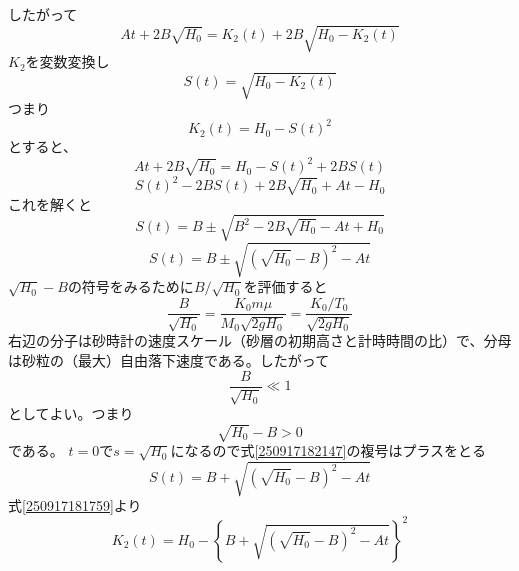 \documentclass[]{article}
\begin{document}
したがって
\begin{equation} \label{250917181329} 
   A t + 2B\sqrt{H_0} = K_2(t) + 2B\sqrt{H_0-K_2(t)}
\end{equation}
$K_2$を変数変換し
\begin{equation} \label{250917181440} 
   S(t) =  \sqrt{H_0 - K_2(t)}
\end{equation}
つまり
\begin{equation} \label{250917181759} 
   K_2(t) = H_0 - S(t)^2
\end{equation}
とすると、
\begin{equation} \label{250917181553} 
   A t + 2B\sqrt{H_0}  = H_0 - S(t)^2 + 2BS(t)
\end{equation}
\begin{equation} \label{250917181633} 
   S(t)^2 - 2BS(t) + 2B\sqrt{H_0} + At - H_0
\end{equation}
これを解くと
\begin{equation} \label{250917181902} 
   S(t) = B \pm \sqrt{B^2-2B\sqrt{H_0} -At + H_0}
\end{equation}
\begin{equation} \label{250917182147} 
   S(t) = B\pm \sqrt{(\sqrt{H_0}-B)^2-At}
\end{equation}
$\sqrt{H_0}-B$の符号をみるために$B/\sqrt{H_0}$を評価すると
\begin{equation} \label{250917182519} 
   \frac{B}{\sqrt{H_0}} = \frac{K_0m\mu}{M_0\sqrt{2gH_0}} = \frac{K_0/T_0}{\sqrt{2gH_0}}
\end{equation}
右辺の分子は砂時計の速度スケール（砂層の初期高さと計時時間の比）で、分母は砂粒の（最大）自由落下速度である。したがって
\begin{equation} \label{250917183422} 
    \frac{B}{\sqrt{H_0}} \ll 1
\end{equation}
としてよい。つまり
\begin{equation} \label{250917183450} 
   \sqrt{H_0}-B >0
\end{equation}
である。
$t=0$で$s=\sqrt{H_0}$になるので式\eqref{250917182147}の複号はプラスをとる
\begin{equation} \label{250917182410} 
   S(t) = B + \sqrt{(\sqrt{H_0}-B)^2-At}
\end{equation}
式\eqref{250917181759}より
\begin{equation} \label{250917183653} 
   K_2(t) = H_0 - \left\{
   				B + \sqrt{(\sqrt{H_0}-B)^2-At}
   				\right\}^2
\end{equation}
\end{document}
